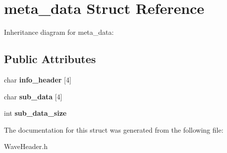 \hypertarget{structmeta__data}{}\section{meta\+\_\+data Struct Reference}
\label{structmeta__data}


Inheritance diagram for meta\+\_\+data\+:
\subsection*{Public Attributes}
\begin{DoxyCompactItemize}
\item 
\mbox{\label{structmeta__data_a454a3db78a63e9cb86f8b5ee4815220e}} 
char {\bfseries info\+\_\+header} \mbox{[}4\mbox{]}
\item 
\mbox{\label{structmeta__data_aa8f980b29f6c5a52d388b3e3b82c7275}} 
char {\bfseries sub\+\_\+data} \mbox{[}4\mbox{]}
\item 
\mbox{\label{structmeta__data_add7a294ec5908ee0d1f2aa4f82a2bf14}} 
int {\bfseries sub\+\_\+data\+\_\+size}
\end{DoxyCompactItemize}


The documentation for this struct was generated from the following file\+:\begin{DoxyCompactItemize}
\item 
Wave\+Header.\+h\end{DoxyCompactItemize}
